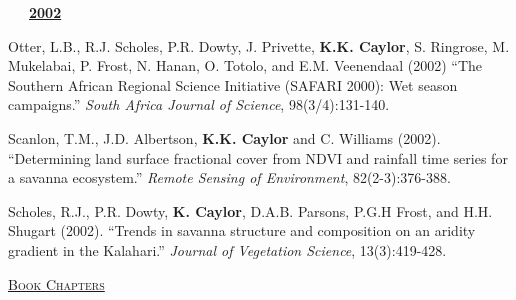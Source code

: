 \documentclass[10pt]{report}
\begin{document}
\begin{etaremune}
\mbox{\ \ \ \underline{\textbf{2002}}}


\item Otter, L.B., R.J. Scholes, P.R. Dowty, J. Privette, \textbf{K.K. Caylor}, S. Ringrose, M. Mukelabai, P. Frost, N. Hanan, O. Totolo, and E.M. Veenendaal (2002) ``The Southern African Regional Science Initiative (SAFARI 2000): Wet season campaigns.'' \emph{South Africa Journal of Science}, 98(3/4):131-140. 

\item Scanlon, T.M., J.D. Albertson, \textbf{K.K. Caylor} and C. Williams (2002). ``Determining land surface fractional cover from NDVI and rainfall time series for a savanna ecosystem.'' \emph{Remote Sensing of Environment}, 82(2-3):376-388.

\item Scholes, R.J., P.R. Dowty, \textbf{K. Caylor}, D.A.B. Parsons, P.G.H Frost, and H.H. Shugart (2002). ``Trends in savanna structure and composition on an aridity gradient in the Kalahari.'' \emph{Journal of Vegetation Science}, 13(3):419-428.
\end{etaremune}
 
\vspace*{.1in}
\textsc{\underline{Book Chapters}}
\vspace*{.1in}
\end{document}
